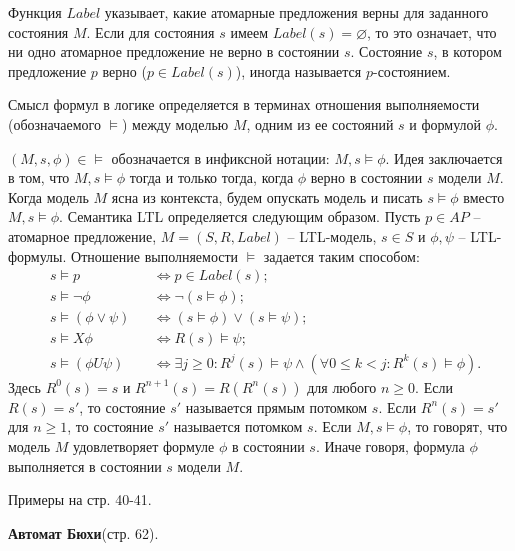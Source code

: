 \documentclass[a4paper,12pt]{article}
\begin{document}
Функция $Label$ указывает, какие атомарные предложения верны для
заданного состояния $M$. Если для состояния $s$ имеем $Label(s) = \varnothing$, то
это означает, что ни одно атомарное предложение не верно в
состоянии $s$. Состояние $s$, в котором предложение $p$ верно
($p \in Label(s)$), иногда называется $p$-состоянием.

Смысл формул в логике определяется в терминах отношения
выполняемости (обозначаемого $\vDash$) между моделью $M$, одним из ее
состояний $s$ и формулой $\phi$.

$(M, s, \phi) \in \vDash$ обозначается в инфиксной нотации: $M, s \vDash \phi$. Идея
заключается в том, что $M, s \vDash \phi$ тогда и только тогда, когда $\phi$ верно в
состоянии $s$ модели $M$. Когда модель $M$ ясна из контекста, будем
опускать модель и писать $s \vDash \phi$ вместо $M, s \vDash \phi$.
Семантика LTL определяется следующим образом. Пусть $p \in AP$ --
атомарное предложение, $M = (S, R, Label)$ -- LTL-модель, $s \in S$ и $\phi, \psi$ --
LTL-формулы. Отношение выполняемости $\vDash$ задается таким
способом:
\begin{align*}
    &s \vDash p &&\Leftrightarrow p \in Label(s);\\
    &s \vDash \lnot \phi &&\Leftrightarrow \lnot(s \vDash \phi);\\
    &s \vDash (\phi \vee \psi) &&\Leftrightarrow (s \vDash \phi) \vee (s \vDash \psi);\\
    &s \vDash X \phi &&\Leftrightarrow R(s) \vDash \psi;\\
    &s \vDash (\phi U \psi) &&\Leftrightarrow \exists j \ge 0: R^j(s) \vDash \psi \wedge (\forall 0 \le k < j: R^k(s) \vDash \phi).
\end{align*}
Здесь $R^0(s) = s$ и $R^{n+1}(s) = R(R^n(s))$ для любого $n \ge 0$.
Если $R(s) = s'$, то состояние $s'$ называется прямым потомком $s$. Если
$R^n(s) = s'$ для $n \ge 1$, то состояние $s'$ называется потомком $s$. Если
$M, s \vDash \phi$, то говорят, что модель $M$ удовлетворяет формуле $\phi$ в
состоянии $s$. Иначе говоря, формула $\phi$ выполняется в состоянии $s$
модели $M$.

Примеры на стр. 40-41.

\textbf{Автомат Бюхи}(стр. 62).
\end{document}
